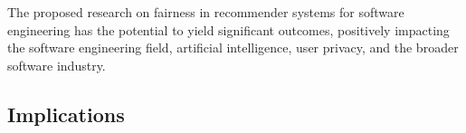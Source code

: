 
The proposed research on fairness %
in recommender systems for software engineering has the potential to yield significant outcomes, %
positively impacting the software engineering field, artificial intelligence, user privacy, and the broader software industry. 
\vspace{-.4cm}
\subsection{Implications}







